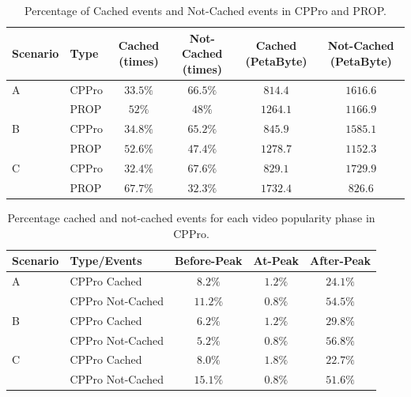 \documentclass[10pt,final,journal,a4paper]{IEEEtran}
\begin{document}
\begin{table}[!t]
\caption{Percentage of Cached events and Not-Cached events in CPPro and PROP.}
\label{tab:stacked1}
\centering
\begin{tabular}{|l|l|c|c|c|c|}
\hline
Scenario & Type & Cached (times)& Not-Cached (times) & Cached (PetaByte) & Not-Cached (PetaByte)\\
\hline
A & CPPro & $33.5\%$ & $66.5\%$ & $814.4$ & $1616.6$ \\
\hline
 & PROP & $52\%$ & $48\%$ & $1264.1$ & $1166.9$\\
\hline

B & CPPro & $34.8\%$ & $65.2\%$ & $845.9$ & $1585.1$\\
\hline
 & PROP & $52.6\%$ & $47.4\%$  &  $1278.7$  &  $1152.3$ \\
\hline
C & CPPro & $32.4\%$ & $67.6\%$  & $829.1$ & $1729.9$ \\
\hline
 & PROP & $67.7\%$ & $32.3\%$ &  $1732.4$ & $826.6$ \\
\hline
\end{tabular}
\end{table}


\begin{table}[!t]
\caption{Percentage cached and not-cached events for each video popularity phase in CPPro.}
\label{tab:stacked2}
\centering
\begin{tabular}{|l|l|c|c|c|}
\hline
Scenario & Type/Events & Before-Peak & At-Peak  & After-Peak \\
\hline
A & CPPro Cached & $8.2\%$ & $1.2\%$ & $24.1\%$  \\
\hline
 & CPPro Not-Cached & $11.2\%$ & $0.8\%$ & $54.5\%$ \\
 \hline

B & CPPro Cached & $6.2\%$ & $1.2\%$ & $29.8\%$ \\
\hline
 & CPPro Not-Cached & $5.2\%$ & $0.8\%$ & $56.8\%$ \\
\hline

C & CPPro Cached & $8.0\%$ & $1.8\%$ & $22.7\%$ \\
\hline
 & CPPro Not-Cached & $15.1\%$ & $0.8\%$ & $51.6\%$ \\
\hline
\end{tabular}
\end{table}
\end{document}
